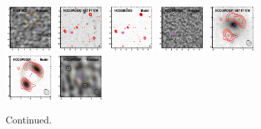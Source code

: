 \documentclass[iop]{emulateapj}
\begin{document}
\begin{figure}[!tbp]
\begin{centering}
\includegraphics[width=0.162\textwidth]{HADFS03_residual_bestfit.pdf}
\includegraphics[width=0.162\textwidth]{HCOSMOS02_optical_bestfit.pdf}
\includegraphics[width=0.162\textwidth]{HCOSMOS02_model_bestfit.pdf}
\includegraphics[width=0.162\textwidth]{HCOSMOS02_residual_bestfit.pdf}
\includegraphics[width=0.162\textwidth]{HCOSMOS01_optical_bestfit.pdf}
\includegraphics[width=0.162\textwidth]{HCOSMOS01_model_bestfit.pdf}
\includegraphics[width=0.162\textwidth]{HCOSMOS01_residual_bestfit.pdf}
\end{centering}

\caption{ Continued.}

\end{figure}


\end{document}
